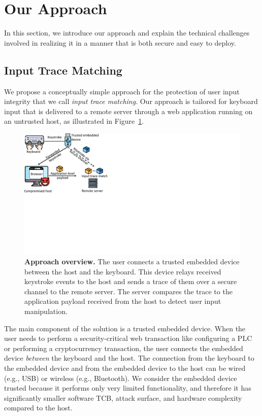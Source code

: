 \section{Our Approach}
\label{sec:ourApproach}

In this section, we introduce our approach and explain the technical challenges involved in realizing it in a manner that is both secure and easy to deploy. 

\subsection{Input Trace Matching}

We propose a conceptually simple approach for the protection of user input integrity that we call \emph{input trace matching}. Our approach is tailored for keyboard input that is delivered to a remote server through a web application running on an untrusted host, as illustrated in Figure~\ref{fig:abstractModel}. 

\begin{figure}[t]
 \centering
  \includegraphics[trim={0 9cm 19.5cm 0},clip,width=0.7\linewidth]{chapters/IntegriKey/images/AbstractModel.pdf}
 \caption[Approach overview]{\textbf{Approach overview.} The user connects a trusted embedded device between the host and the keyboard. This device relays received keystroke events to the host and sends a trace of them over a secure channel to the remote server. The server compares the trace to the application payload received from the host to detect user input manipulation.}
 
 \label{fig:abstractModel}
\end{figure}

The main component of the solution is a trusted embedded device. When the user needs to perform a security-critical web transaction like configuring a PLC or performing a cryptocurrency transaction, the user connects the embedded device \emph{between} the keyboard and the host. The connection from the keyboard to the embedded device and from the embedded device to the host can be wired (e.g., USB) or wireless (e.g., Bluetooth). We consider the embedded device trusted because it performs only very limited functionality, and therefore it has significantly smaller software TCB, attack surface, and hardware complexity compared to the host. 

